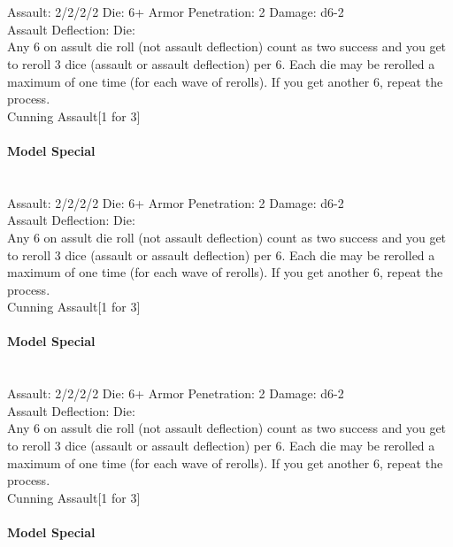 \ \\

\ \\
Assault: 2/2/2/2 Die: 6+ Armor Penetration: 2 Damage: d6-2 \\
Assault Deflection:  Die: \\
\indent Any 6 on assult die roll (not assault deflection) count as two success and you get to reroll 3 dice (assault or assault deflection) per 6. Each die may be rerolled a maximum of one time (for each wave of rerolls). If you get another 6, repeat the process. \\ Cunning Assault[1 for 3] \\
\ \\
{\bf Model Special} \\

\ \\

\ \\
Assault: 2/2/2/2 Die: 6+ Armor Penetration: 2 Damage: d6-2 \\
Assault Deflection:  Die: \\
\indent Any 6 on assult die roll (not assault deflection) count as two success and you get to reroll 3 dice (assault or assault deflection) per 6. Each die may be rerolled a maximum of one time (for each wave of rerolls). If you get another 6, repeat the process. \\ Cunning Assault[1 for 3] \\
\ \\
{\bf Model Special} \\

\ \\

\ \\
Assault: 2/2/2/2 Die: 6+ Armor Penetration: 2 Damage: d6-2 \\
Assault Deflection:  Die: \\
\indent Any 6 on assult die roll (not assault deflection) count as two success and you get to reroll 3 dice (assault or assault deflection) per 6. Each die may be rerolled a maximum of one time (for each wave of rerolls). If you get another 6, repeat the process. \\ Cunning Assault[1 for 3] \\
\ \\
{\bf Model Special} \\

\ \\



